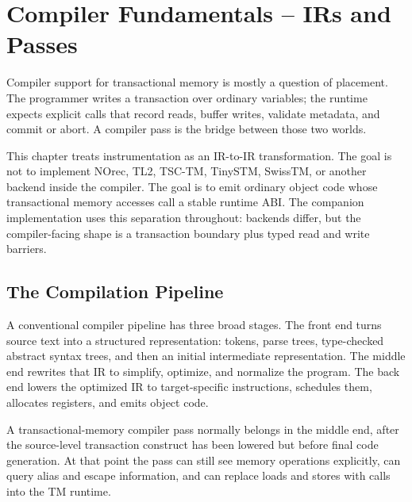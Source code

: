 \chapter{Compiler Fundamentals – IRs and Passes}

Compiler support for transactional memory is mostly a question of placement. The programmer writes a transaction over ordinary variables; the runtime expects explicit calls that record reads, buffer writes, validate metadata, and commit or abort. A compiler pass is the bridge between those two worlds.

This chapter treats instrumentation as an IR-to-IR transformation. The goal is not to implement NOrec, TL2, TSC-TM, TinySTM, SwissTM, or another backend inside the compiler. The goal is to emit ordinary object code whose transactional memory accesses call a stable runtime ABI. The companion implementation uses this separation throughout: backends differ, but the compiler-facing shape is a transaction boundary plus typed read and write barriers.

\section{The Compilation Pipeline}

A conventional compiler pipeline has three broad stages. The front end turns source text into a structured representation: tokens, parse trees, type-checked abstract syntax trees, and then an initial intermediate representation. The middle end rewrites that IR to simplify, optimize, and normalize the program. The back end lowers the optimized IR to target-specific instructions, schedules them, allocates registers, and emits object code.

A transactional-memory compiler pass normally belongs in the middle end, after the source-level transaction construct has been lowered but before final code generation. At that point the pass can still see memory operations explicitly, can query alias and escape information, and can replace loads and stores with calls into the TM runtime.


